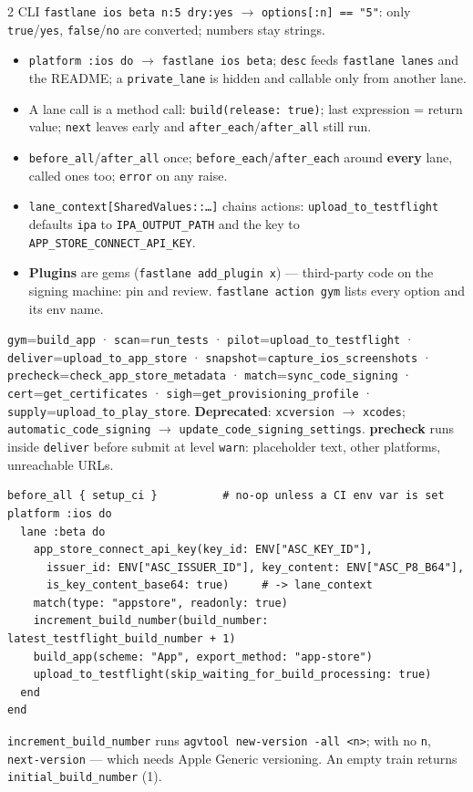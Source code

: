 \documentclass[8pt]{extarticle}
\newcommand\ct[1]{\texttt{#1}}
\newcommand\hd[1]{\par\vspace{3pt}\noindent{\bfseries\color{sheetBlue}#1}\par\vspace{1pt}}
\begin{document}
\begin{multicols}{2}
CLI \ct{fastlane ios beta n:5 dry:yes} $\to$ \ct{options[:n] == "5"}: only \ct{true}/\ct{yes},
\ct{false}/\ct{no} are converted; numbers stay strings.

\hd{Lanes}
\begin{itemize}
  \item \ct{platform :ios do} $\to$ \ct{fastlane ios beta}; \ct{desc} feeds \ct{fastlane lanes} and the
        README; a \ct{private\_lane} is hidden and callable only from another lane.
  \item A lane call is a method call: \ct{build(release: true)}; last expression = return value;
        \ct{next} leaves early and \ct{after\_each}/\ct{after\_all} still run.
  \item \ct{before\_all}/\ct{after\_all} once; \ct{before\_each}/\ct{after\_each} around \textbf{every}
        lane, called ones too; \ct{error} on any raise.
  \item \ct{lane\_context[SharedValues::…]} chains actions: \ct{upload\_to\_testflight} defaults
        \ct{ipa} to \ct{IPA\_OUTPUT\_PATH} and the key to \ct{APP\_STORE\_CONNECT\_API\_KEY}.
  \item \textbf{Plugins} are gems (\ct{fastlane add\_plugin x}) — third-party code on the signing
        machine: pin and review. \ct{fastlane action gym} lists every option and its env name.
\end{itemize}

\hd{Tool $\leftrightarrow$ action}
{\scriptsize \ct{gym}=\ct{build\_app} · \ct{scan}=\ct{run\_tests} · \ct{pilot}=\ct{upload\_to\_testflight} ·
\ct{deliver}=\ct{upload\_to\_app\_store} · \ct{snapshot}=\ct{capture\_ios\_screenshots} ·
\ct{precheck}=\ct{check\_app\_store\_metadata} · \ct{match}=\ct{sync\_code\_signing} ·
\ct{cert}=\ct{get\_certificates} · \ct{sigh}=\ct{get\_provisioning\_profile} ·
\ct{supply}=\ct{upload\_to\_play\_store}. \textbf{Deprecated}: \ct{xcversion} $\to$ \ct{xcodes};
\ct{automatic\_code\_signing} $\to$ \ct{update\_code\_signing\_settings}. \textbf{precheck} runs inside
\ct{deliver} before submit at level \ct{warn}: placeholder text, other platforms, unreachable URLs.}

\hd{Example — Fastfile}
\begin{lstlisting}[language=RubySheet]
before_all { setup_ci }          # no-op unless a CI env var is set
platform :ios do
  lane :beta do
    app_store_connect_api_key(key_id: ENV["ASC_KEY_ID"],
      issuer_id: ENV["ASC_ISSUER_ID"], key_content: ENV["ASC_P8_B64"],
      is_key_content_base64: true)     # -> lane_context
    match(type: "appstore", readonly: true)
    increment_build_number(build_number: latest_testflight_build_number + 1)
    build_app(scheme: "App", export_method: "app-store")
    upload_to_testflight(skip_waiting_for_build_processing: true)
  end
end
\end{lstlisting}
\ct{increment\_build\_number} runs \ct{agvtool new-version -all <n>}; with no \ct{n}, \ct{next-version}
— which needs Apple Generic versioning. An empty train returns \ct{initial\_build\_number} (1).


\end{multicols}
\end{document}
